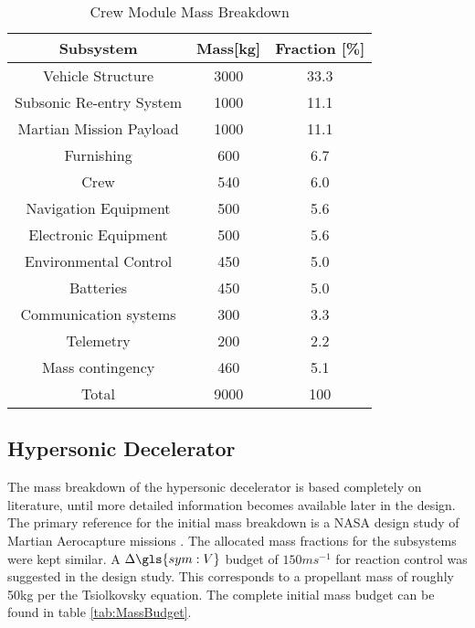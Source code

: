 \begin{table}[H]
	\centering
	\caption{Crew Module Mass Breakdown}
	\begin{tabular}{|c|c|c|}
    \hline
    Subsystem        					& Mass[kg] 	& Fraction [\%] \\ \hline \hline
    Vehicle Structure 				& 3000			& 33.3 					\\ \hline 
		Subsonic Re-entry System	& 1000			& 11.1					\\ \hline
		Martian Mission Payload 	& 1000			& 11.1 					\\ \hline
		Furnishing								& 600				& 6.7 					\\ \hline
		Crew											& 540				& 6.0						\\ \hline
		Navigation Equipment			& 500				& 5.6						\\ \hline
		Electronic Equipment 			& 500				& 5.6						\\ \hline
		Environmental Control			& 450				& 5.0						\\ \hline
		Batteries									&	450				&	5.0						\\ \hline
		Communication systems			& 300				& 3.3						\\ \hline
		Telemetry									& 200				& 2.2						\\ \hline
		Mass contingency					&	460				& 5.1						\\ \hline
		Total											&	9000			& 100						\\ \hline
    \end{tabular}
    \label{tab:CVMB}
\end{table}

\subsection{Hypersonic Decelerator}
The mass breakdown of the hypersonic decelerator is based completely on literature, until more detailed information becomes available later in the design. The primary reference for the initial mass breakdown is a NASA design study of Martian Aerocapture missions \cite{Cianciolo2010}. The allocated mass fractions for the subsystems were kept similar. A $\Delta \gls{sym:V}$ budget of $150 ms^{-1}$ for reaction control was suggested in the design study. This corresponds to a propellant mass of roughly 50kg per the Tsiolkovsky equation. The complete initial mass budget can be found in table \ref{tab:MassBudget}. 

